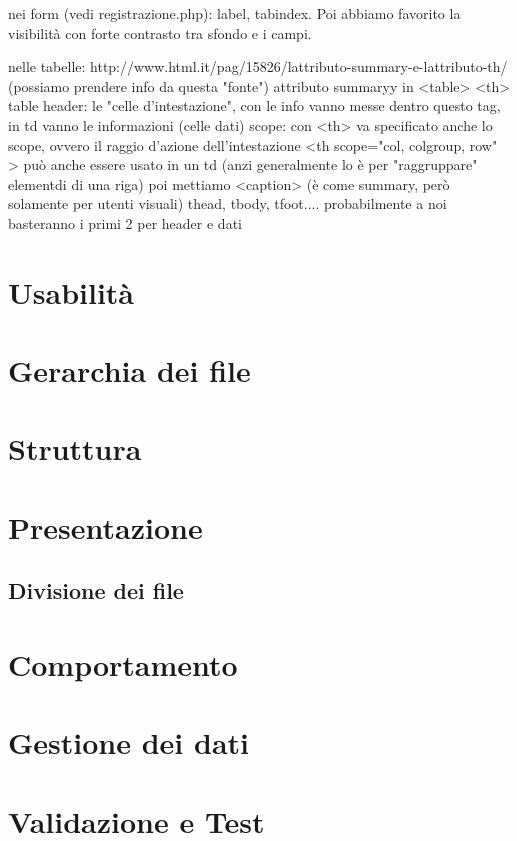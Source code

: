 \documentclass[10pt, a4paper]{article}
\begin{document}
		nei form (vedi registrazione.php): label, tabindex. Poi abbiamo favorito la visibilità con forte contrasto tra sfondo e i campi.
		
		nelle tabelle:
		http://www.html.it/pag/15826/lattributo-summary-e-lattributo-th/  (possiamo prendere info da questa "fonte")
			attributo summaryy in <table>
			<th> table header: le "celle d’intestazione", con le info vanno messe dentro questo tag, in td vanno le informazioni (celle dati)
			scope: con <th> va specificato anche lo scope, ovvero il raggio d'azione dell'intestazione <th scope="col, colgroup, row" >
			può anche essere usato in un td (anzi generalmente lo è per "raggruppare" elementdi di una riga)
			poi mettiamo <caption> (è come summary, però solamente per utenti visuali)
			thead, tbody, tfoot.... probabilmente a noi basteranno i primi 2 per header e dati
\section{Usabilità}

\section{Gerarchia dei file}

\section{Struttura}

\section{Presentazione}
	\subsection{Divisione dei file}

\section{Comportamento}

\section{Gestione dei dati}

\section{Validazione e Test}
\end{document}
